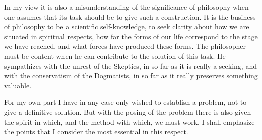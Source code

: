 \documentclass[12pt,a4paper,openany]{book}
\begin{document}
In my view it is also a misunderstanding of
the significance of philosophy when one assumes that its task
should be to give such a construction. It is
the business of philosophy to be a scientific self-knowledge, to seek
clarity about how we are situated in spiritual respects,
how far the forms of our life correspond to the stage we have reached,
and what forces have produced these forms.
The philosopher must be content when he can contribute to the
solution of this task. He sympathizes with the unrest of the
Skeptics, in so far as it is really a seeking, and with the
conservatism of the Dogmatists, in so far as it really
preserves something valuable.

For my own part I have in any case only
wished to establish a problem, not to give a definitive solution.
But with the posing of the problem there is also given the spirit in
which, and the method with which, we must work. I shall
emphasize the points that I consider
the most essential in this respect.
\end{document}
